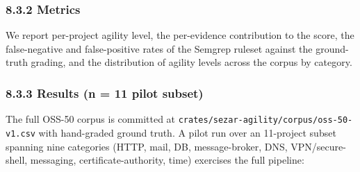 \subsubsection{8.3.2 Metrics}\label{metrics-2}

We report per-project agility level, the per-evidence contribution to
the score, the false-negative and false-positive rates of the Semgrep
ruleset against the ground-truth grading, and the distribution of
agility levels across the corpus by category.

\subsubsection{8.3.3 Results (n = 11 pilot
subset)}\label{results-n-11-pilot-subset}

The full OSS-50 corpus is committed at
\texttt{crates/sezar-agility/corpus/oss-50-v1.csv} with hand-graded
ground truth. A pilot run over an 11-project subset spanning nine
categories (HTTP, mail, DB, message-broker, DNS, VPN/secure-shell,
messaging, certificate-authority, time) exercises the full pipeline:

